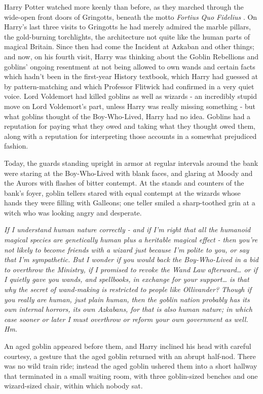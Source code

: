 Harry Potter watched more keenly than before, as they marched through
the wide-open front doors of Gringotts, beneath the motto \emph{Fortius
Quo Fidelius} . On Harry's last three visits to Gringotts he had merely
admired the marble pillars, the gold-burning torchlights, the
architecture not quite like the human parts of magical Britain. Since
then had come the Incident at Azkaban and other things; and now, on his
fourth visit, Harry was thinking about the Goblin Rebellions and
goblins' ongoing resentment at not being allowed to own wands and
certain facts which hadn't been in the first-year History textbook,
which Harry had guessed at by pattern-matching and which Professor
Flitwick had confirmed in a very quiet voice. Lord Voldemort had killed
goblins as well as wizards - an incredibly stupid move on Lord
Voldemort's part, unless Harry was really missing something - but what
goblins thought of the Boy-Who-Lived, Harry had no idea. Goblins had a
reputation for paying what they owed and taking what they thought owed
them, along with a reputation for interpreting those accounts in a
somewhat prejudiced fashion.

Today, the guards standing upright in armor at regular intervals around
the bank were staring at the Boy-Who-Lived with blank faces, and glaring
at Moody and the Aurors with flashes of bitter contempt. At the stands
and counters of the bank's foyer, goblin tellers stared with equal
contempt at the wizards whose hands they were filling with Galleons; one
teller smiled a sharp-toothed grin at a witch who was looking angry and
desperate.

\emph{If I understand human nature correctly - and if I'm right that all
the humanoid magical species are genetically human plus a heritable
magical effect - then you're not likely to become friends with a wizard
just because I'm polite to you, or say that I'm sympathetic. But}
\emph{I wonder if you would back the Boy-Who-Lived in a bid to overthrow
the Ministry, if I promised to revoke the Wand Law afterward\ldots{} or
if I quietly gave you wands, and spellbooks, in exchange for your
support\ldots{} is that why the secret of wand-making is restricted to
people like Ollivander? Though if you really are human, just plain
human, then the goblin nation probably has its own internal horrors, its
own Azkabans, for that is also human nature; in which case sooner or
later I must overthrow or reform your own government as well. Hm.}

An aged goblin appeared before them, and Harry inclined his head with
careful courtesy, a gesture that the aged goblin returned with an abrupt
half-nod. There was no wild train ride; instead the aged goblin ushered
them into a short hallway that terminated in a small waiting room, with
three goblin-sized benches and one wizard-sized chair, within which
nobody sat.

